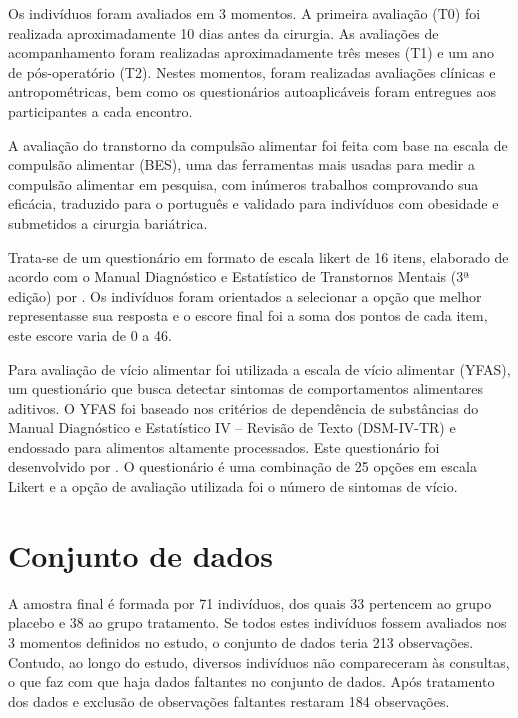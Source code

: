 Os indivíduos foram avaliados em 3 momentos. A primeira avaliação (T0) foi realizada aproximadamente 10 dias antes da cirurgia. As avaliações de acompanhamento foram realizadas aproximadamente três meses (T1) e um ano de pós-operatório (T2). Nestes momentos, foram realizadas avaliações clínicas e antropométricas, bem como os questionários autoaplicáveis foram entregues aos participantes a cada encontro.

A avaliação do transtorno da compulsão alimentar foi feita com base na escala de compulsão alimentar (BES), uma das ferramentas mais usadas para medir a compulsão alimentar em pesquisa, com inúmeros trabalhos comprovando sua eficácia, traduzido para o português e validado para indivíduos com obesidade e submetidos a cirurgia bariátrica. 

Trata-se de um questionário em formato de escala likert de 16 itens, elaborado de acordo com o Manual Diagnóstico e Estatístico de Transtornos Mentais (3ª edição) \citep{spitzer1980diagnostic} por \citet{gormally1982assessment}. Os indivíduos foram orientados a selecionar a opção que melhor representasse sua resposta e o escore final foi a soma dos pontos de cada item, este escore varia de 0 a 46.

Para avaliação de vício alimentar foi utilizada a escala de vício alimentar (YFAS), um questionário que busca detectar sintomas de comportamentos alimentares aditivos. O YFAS foi baseado nos critérios de dependência de substâncias do Manual Diagnóstico e Estatístico IV – Revisão de Texto (DSM-IV-TR) \citep{segal2010diagnostic} e endossado para alimentos altamente processados. Este questionário foi desenvolvido por \citet{gearhardt2009preliminary}. O questionário é uma combinação de 25 opções em escala Likert e a opção de avaliação utilizada foi o número de sintomas de vício.


\section{Conjunto de dados}

A amostra final é formada por 71 indivíduos, dos quais 33 pertencem ao grupo placebo e 38 ao grupo tratamento. Se todos estes indivíduos fossem avaliados nos 3 momentos definidos no estudo, o conjunto de dados teria 213 observações. Contudo, ao longo do estudo, diversos indivíduos não compareceram às consultas, o que faz com que haja dados faltantes no conjunto de dados. Após tratamento dos dados e exclusão de observações faltantes restaram 184 observações.

